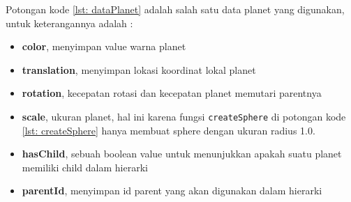 Potongan kode \ref{lst: dataPlanet} adalah salah satu data planet yang digunakan, untuk keterangannya adalah :

\begin{itemize}
  \item \textbf{color}, menyimpan value warna planet
  \item \textbf{translation}, menyimpan lokasi koordinat lokal planet
  \item \textbf{rotation}, kecepatan rotasi dan kecepatan planet memutari parentnya
  \item \textbf{scale}, ukuran planet, hal ini karena fungsi \texttt{createSphere} di potongan kode \ref{lst: createSphere} hanya membuat sphere dengan ukuran radius 1.0.
  \item \textbf{hasChild}, sebuah boolean value untuk menunjukkan apakah suatu planet memiliki child dalam hierarki
  \item \textbf{parentId}, menyimpan id parent yang akan digunakan dalam hierarki
\end{itemize}
